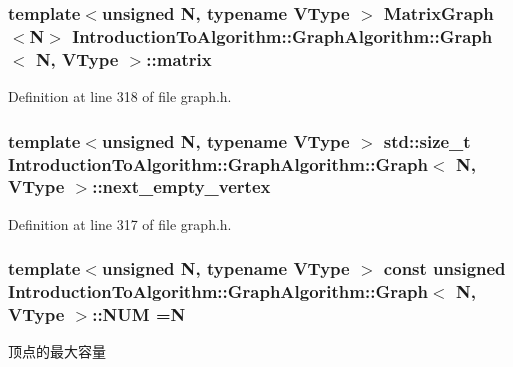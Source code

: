 \subsubsection[{matrix}]{\setlength{\rightskip}{0pt plus 5cm}template$<$unsigned N, typename V\+Type $>$ {\bf Matrix\+Graph}$<$N$>$ {\bf Introduction\+To\+Algorithm\+::\+Graph\+Algorithm\+::\+Graph}$<$ N, V\+Type $>$\+::matrix}\label{struct_introduction_to_algorithm_1_1_graph_algorithm_1_1_graph_a498323460ec613f12e1039afdca6c10a}


Definition at line 318 of file graph.\+h.

\hypertarget{struct_introduction_to_algorithm_1_1_graph_algorithm_1_1_graph_a07a8f2eafc8175787a6ce1f26f1252d0}{}
\subsubsection[{next\+\_\+empty\+\_\+vertex}]{\setlength{\rightskip}{0pt plus 5cm}template$<$unsigned N, typename V\+Type $>$ std\+::size\+\_\+t {\bf Introduction\+To\+Algorithm\+::\+Graph\+Algorithm\+::\+Graph}$<$ N, V\+Type $>$\+::next\+\_\+empty\+\_\+vertex}\label{struct_introduction_to_algorithm_1_1_graph_algorithm_1_1_graph_a07a8f2eafc8175787a6ce1f26f1252d0}


Definition at line 317 of file graph.\+h.

\hypertarget{struct_introduction_to_algorithm_1_1_graph_algorithm_1_1_graph_aba53db2c8cade306553fc1e03f138aa2}{}
\subsubsection[{N\+U\+M}]{\setlength{\rightskip}{0pt plus 5cm}template$<$unsigned N, typename V\+Type $>$ const unsigned {\bf Introduction\+To\+Algorithm\+::\+Graph\+Algorithm\+::\+Graph}$<$ N, V\+Type $>$\+::N\+U\+M =N\hspace{0.3cm}{\ttfamily [static]}}\label{struct_introduction_to_algorithm_1_1_graph_algorithm_1_1_graph_aba53db2c8cade306553fc1e03f138aa2}
顶点的最大容量 

